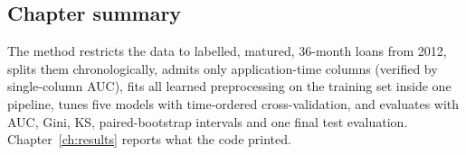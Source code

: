 \subsection{Chapter summary}

The method restricts the data to labelled, matured, 36-month loans from 2012, splits them chronologically, admits only application-time columns (verified by single-column AUC), fits all learned preprocessing on the training set inside one pipeline, tunes five models with time-ordered cross-validation, and evaluates with AUC, Gini, KS, paired-bootstrap intervals and one final test evaluation. Chapter~\ref{ch:results} reports what the code printed.
